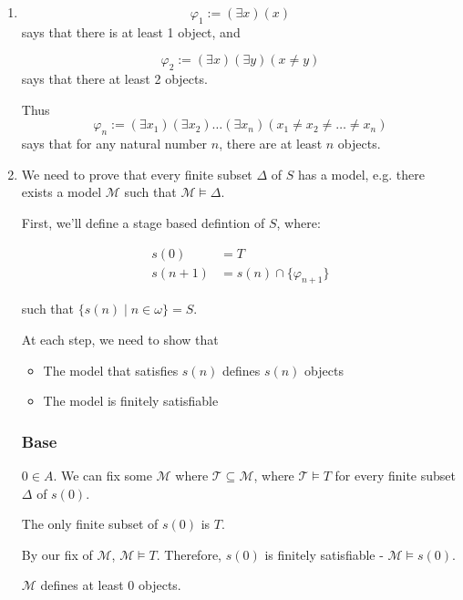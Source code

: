 \documentclass[a4paper]{article}
\newcommand{\SET}[1]{\{ {#1} \}}
\begin{document}
\begin{enumerate}

    \item

\[\varphi_1 := (\exists x)(x)\] says that there is at least 1 object, and

\[\varphi_2 := (\exists x)(\exists y) (x \neq y)\] says that there at least 2 objects.

Thus \[\varphi_n := (\exists x_1)(\exists x_2) \ldots (\exists x_n)( x_1 \neq x_2 \neq \ldots \neq x_n) \] says that for any natural number $n$, there are at least $n$ objects.

    \item

    We need to prove that every finite subset $\Delta$ of $S$ has a model, e.g. there exists a model $\mathcal{M}$ such that $\mathcal{M} \models \Delta$.

    First, we'll define a stage based defintion of $S$, where:

    \begin{align*}
        s(0) & = T\\
        s(n + 1) & = s(n) \cap \SET { \varphi_{n + 1}}
    \end{align*}

    such that $\SET{ s(n) \mid n \in \omega } = S$.

    At each step, we need to show that

    \begin{itemize}
        \item The model that satisfies $s(n)$ defines $s(n)$ objects
        \item The model is finitely satisfiable 
        
    \end{itemize}

    \subsubsection*{Base} 
    $0 \in A$. We can fix some $\mathcal{M}$ where $\mathcal{T} \subseteq \mathcal{M}$, where $\mathcal{T} \models T$ for every finite subset $\Delta$ of $s(0)$.
    
        The only finite subset of $s(0)$ is $T$.
        
        By our fix of $\mathcal{M}$, $\mathcal{M} \models T$. Therefore, $s(0)$ is finitely satisfiable - $\mathcal{M} \models s(0)$.
    
        $\mathcal{M}$ defines at least 0 objects.


\end{enumerate}
\end{document}
